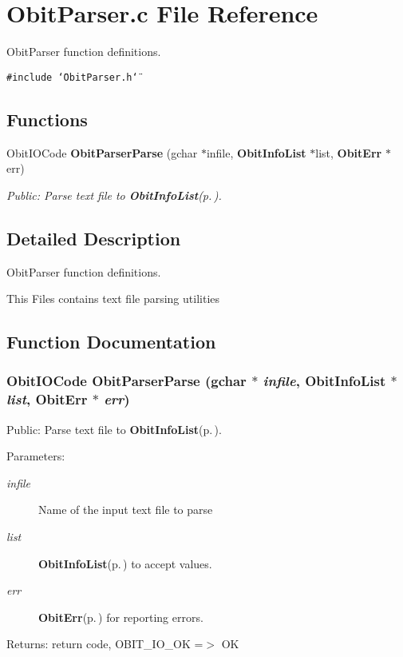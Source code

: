 \section{Obit\-Parser.c File Reference}
\label{ObitParser_8c}
Obit\-Parser function definitions. 

{\tt \#include \char`\"{}Obit\-Parser.h\char`\"{}}\par
\subsection*{Functions}
\begin{CompactItemize}
\item 
Obit\-IOCode {\bf Obit\-Parser\-Parse} (gchar $\ast$infile, {\bf Obit\-Info\-List} $\ast$list, {\bf Obit\-Err} $\ast$err)
\begin{CompactList}\small\item\em Public: Parse text file to {\bf Obit\-Info\-List}{\rm (p.\,\pageref{structObitInfoList})}. \item\end{CompactList}\end{CompactItemize}


\subsection{Detailed Description}
Obit\-Parser function definitions. 

This Files contains text file parsing utilities

\subsection{Function Documentation}
\subsubsection{\setlength{\rightskip}{0pt plus 5cm}Obit\-IOCode Obit\-Parser\-Parse (gchar $\ast$ {\em infile}, {\bf Obit\-Info\-List} $\ast$ {\em list}, {\bf Obit\-Err} $\ast$ {\em err})}\label{ObitParser_8c_a1}


Public: Parse text file to {\bf Obit\-Info\-List}{\rm (p.\,\pageref{structObitInfoList})}. 

\begin{Desc}
\item[Parameters:]
\begin{description}
\item[{\em infile}]Name of the input text file to parse \item[{\em list}]{\bf Obit\-Info\-List}{\rm (p.\,\pageref{structObitInfoList})} to accept values. \item[{\em err}]{\bf Obit\-Err}{\rm (p.\,\pageref{structObitErr})} for reporting errors. \end{description}
\end{Desc}
\begin{Desc}
\item[Returns:]return code, OBIT\_\-IO\_\-OK =$>$ OK \end{Desc}
